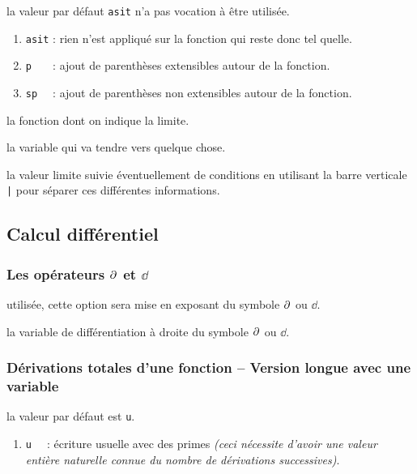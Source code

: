 \documentclass[12pt,a4paper]{book}
\theoremstyle{definition}
\begin{document}
{{\IDoption{}  la valeur par défaut \verb+asit+ n'a pas vocation à être utilisée. 
\begin{enumerate}
	\item \verb+asit+ : rien n'est appliqué sur la fonction qui reste donc tel quelle.
	
	\item \verb+p   + : ajout de parenthèses extensibles autour de la fonction.

	\item \verb+sp  + : ajout de parenthèses non extensibles autour de la fonction.
\end{enumerate}


 la fonction dont on indique la limite.

 la variable qui va tendre vers quelque chose.

 la valeur limite suivie éventuellement de conditions en utilisant la barre verticale \verb+|+ pour séparer ces différentes informations.


\subsection{Calcul différentiel}

\subsubsection{\texorpdfstring{Les opérateurs $\pp{}$ et $\dd{}$}%
                           {Les opérateurs "d rond" et "d droit"}}





\IDoption{} utilisée, cette option sera mise en exposant du symbole $\pp{}$ ou $\dd{}$.

\IDarg{} la variable de différentiation à droite du symbole $\pp{}$ ou $\dd{}$.




\subsubsection{Dérivations totales d'une fonction -- Version longue avec une variable}




\IDoption{} la valeur par défaut est \verb+u+. 
\begin{enumerate}
	\item \verb+u  + : écriture usuelle avec des primes \emph{(ceci nécessite d'avoir une valeur entière naturelle connue du nombre de dérivations successives)}.


\end{enumerate}}}
\end{document}
